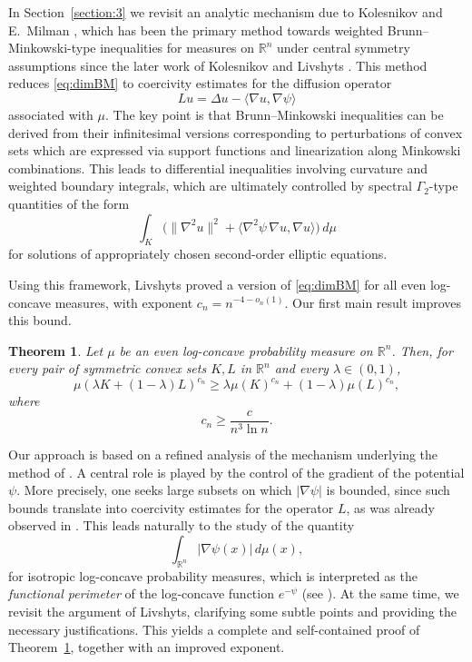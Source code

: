 \documentclass[11pt,leqno]{article}
\newtheorem{theorem}{Theorem}[section]
\theoremstyle{definition}
\theoremstyle{remark}
\numberwithin{equation}{section}
\newcommand{\gr}{\geqslant}
\newcommand{\1}{\textbf{1}}
\newcommand{\R}{\mathbb{R}}
\begin{document}
\medskip

In Section~\ref{section:3} we revisit an analytic mechanism due to Kolesnikov and E.~Milman \cite{Kolesnikov-Milman-2018, Kolesnikov-Milman-2022}, which has been the primary method towards weighted Brunn--Minkowski-type inequalities for measures on $\R^n$ under central symmetry assumptions since the later work of Kolesnikov and Livshyts \cite{Kolesnikov-Livshyts-2021}. This method reduces \eqref{eq:dimBM} to coercivity estimates for the diffusion operator
$$Lu=\Delta u-\langle \nabla u,\nabla\psi\rangle$$
associated with $\mu$. The key point is that Brunn--Minkowski inequalities can be derived from their infinitesimal versions corresponding to perturbations of convex sets which are expressed via support functions and linearization along Minkowski combinations. This leads to differential inequalities involving curvature and weighted boundary integrals, which are ultimately controlled by spectral $\Gamma_2$-type quantities of the form
$$\int_K \big(\|\nabla^2 u\|^2+\langle \nabla^2\psi\,\nabla u,\nabla u\rangle\big) \,d\mu$$
for solutions of appropriately chosen second-order elliptic equations.

Using this framework, Livshyts \cite{Livshyts-2023} proved a version of \eqref{eq:dimBM} for all even log-concave measures, with exponent $c_n = n^{-4-o_n(1)}$. Our first main result improves this bound.

\begin{theorem}\label{thm:dimBM-main}
Let $\mu$ be an even log-concave probability measure on $\mathbb{R}^n$. Then, for every pair of symmetric convex sets $K,L$ in $\mathbb{R}^n$ and every $\lambda\in (0,1)$,
\begin{equation} \label{equ:dim1}\mu(\lambda K+(1-\lambda) L)^{c_n} \gr \lambda \mu(K)^{c_n}+(1-\lambda)\mu(L)^{c_n},
\end{equation}
where
\begin{equation} c_n \gr \frac{c}{n^3 \ln n}.
\end{equation}
\end{theorem}

Our approach is based on a refined analysis of the mechanism underlying the method of \cite{Kolesnikov-Milman-2018,Kolesnikov-Milman-2022,Livshyts-2023}. A central role is played by the control of the gradient of the potential $\psi$. More precisely, one seeks large subsets on which $|\nabla\psi|$ is bounded, since such bounds translate into coercivity estimates for the operator $L$, as was already observed in \cite{Livshyts-2023}. This leads naturally to the study of the quantity
\begin{equation}\label{eq:main-quantity}
\int_{\mathbb{R}^n} |\nabla \psi(x)|\, d\mu(x),
\end{equation}
for isotropic log-concave probability measures, which is interpreted as the \emph{functional perimeter} of the log-concave function $e^{-\psi}$ (see \cite{Colesanti-Fragala-2013, Cordero-Klartag-2015, Rotem-2022, Rotem-2023}). At the same time, we revisit the argument of Livshyts, clarifying some subtle points and providing the necessary justifications. This yields a complete and self-contained proof of Theorem~\ref{thm:dimBM-main}, together with an improved exponent.
\end{document}
